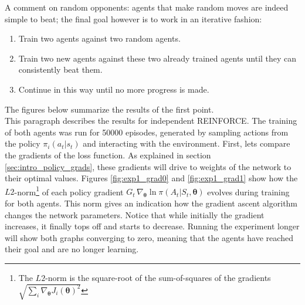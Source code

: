 A comment on random opponents: agents that make random moves are indeed simple to beat; the final goal however is to work in an iterative fashion: 
\begin{enumerate}
    \item Train two agents against two random agents.
    \item Train two new agents against these two already trained agents until they can consistently beat them.
    \item Continue in this way until no more progress is made.
\end{enumerate}
The figures below summarize the results of the first point.\\

This paragraph describes the results for independent REINFORCE. The training of both agents was run for 50000 episodes, generated by sampling actions from the policy $\pi_i(a_t|s_t)$ and interacting with the environment. First, lets compare the gradients of the loss function. As explained in section \ref{sec:intro_policy_grads}, these gradients will drive to weights of the network to their optimal values. Figures \ref{fig:exp1_grad0} and \ref{fig:exp1_grad1} show how the $L2$-norm\footnote{The $L2$-norm is the square-root of the sum-of-squares of the gradients $\sqrt{\sum_i \nabla_{\bm{\theta}} J_{i}(\bm{\theta})^2}$}  of each policy gradient $G_t \, \nabla_{\bm{\theta}} \ln \pi(A_t|S_t,\bm{\theta})$ evolves during training for both agents. This norm gives an indication how the gradient ascent algorithm changes the network parameters. Notice that while initially the gradient increases, it finally tops off and starts to decrease. Running the experiment longer will show both graphs converging to zero, meaning that the agents have reached their goal and are no longer learning.\\
